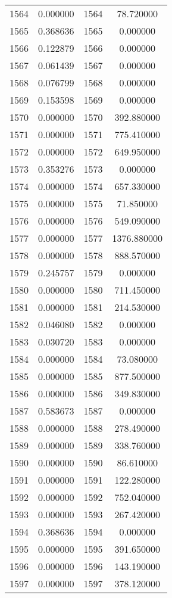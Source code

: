 \documentclass[12pt]{article}
\begin{document}
\begin{longtable}{@{}cccc@{}}
1564 & 0.000000 & 1564 & 78.720000 \\
1565 & 0.368636 & 1565 & 0.000000 \\
1566 & 0.122879 & 1566 & 0.000000 \\
1567 & 0.061439 & 1567 & 0.000000 \\
1568 & 0.076799 & 1568 & 0.000000 \\
1569 & 0.153598 & 1569 & 0.000000 \\
1570 & 0.000000 & 1570 & 392.880000 \\
1571 & 0.000000 & 1571 & 775.410000 \\
1572 & 0.000000 & 1572 & 649.950000 \\
1573 & 0.353276 & 1573 & 0.000000 \\
1574 & 0.000000 & 1574 & 657.330000 \\
1575 & 0.000000 & 1575 & 71.850000 \\
1576 & 0.000000 & 1576 & 549.090000 \\
1577 & 0.000000 & 1577 & 1376.880000 \\
1578 & 0.000000 & 1578 & 888.570000 \\
1579 & 0.245757 & 1579 & 0.000000 \\
1580 & 0.000000 & 1580 & 711.450000 \\
1581 & 0.000000 & 1581 & 214.530000 \\
1582 & 0.046080 & 1582 & 0.000000 \\
1583 & 0.030720 & 1583 & 0.000000 \\
1584 & 0.000000 & 1584 & 73.080000 \\
1585 & 0.000000 & 1585 & 877.500000 \\
1586 & 0.000000 & 1586 & 349.830000 \\
1587 & 0.583673 & 1587 & 0.000000 \\
1588 & 0.000000 & 1588 & 278.490000 \\
1589 & 0.000000 & 1589 & 338.760000 \\
1590 & 0.000000 & 1590 & 86.610000 \\
1591 & 0.000000 & 1591 & 122.280000 \\
1592 & 0.000000 & 1592 & 752.040000 \\
1593 & 0.000000 & 1593 & 267.420000 \\
1594 & 0.368636 & 1594 & 0.000000 \\
1595 & 0.000000 & 1595 & 391.650000 \\
1596 & 0.000000 & 1596 & 143.190000 \\
1597 & 0.000000 & 1597 & 378.120000 \\

\end{longtable}
\end{document}
